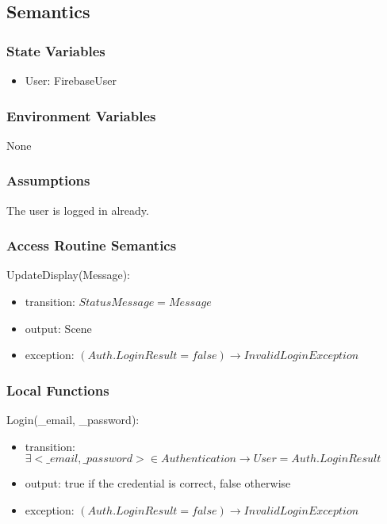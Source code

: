 \documentclass[12pt, titlepage]{article}
\begin{document}
\subsection{Semantics}

\subsubsection{State Variables}

\begin{itemize}
\item User: FirebaseUser
\end{itemize}

\subsubsection{Environment Variables}

None

\subsubsection{Assumptions}

The user is logged in already.

\subsubsection{Access Routine Semantics}

\noindent UpdateDisplay(Message):
\begin{itemize}
\item transition: $StatusMessage = Message$ 
\item output: Scene
\item exception: $(Auth.LoginResult = false) \rightarrow InvalidLoginException$
\end{itemize}

\subsubsection{Local Functions}

\noindent Login(\_email, \_password):
\begin{itemize}
\item transition: $\exists <\_email, \_password> \in Authentication \rightarrow User = Auth.LoginResult$ 
\item output: true if the credential is correct, false otherwise
\item exception: $(Auth.LoginResult = false) \rightarrow InvalidLoginException$
\end{itemize}
\end{document}

